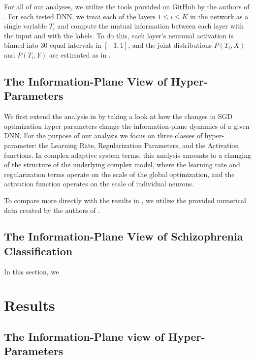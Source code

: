 \documentclass[conference, 5pt]{IEEEtran}
\begin{document}
For all of our analyses, we utilize the tools provided on GitHub by the authors of \cite{shwartz2017opening}.  For each tested DNN, we treat each of the layers $1\le i\le K$ in the network as a single variable $T_i$ and compute the mutual information between each layer with the input and with the labels. To do this, each layer's neuronal activation is binned into 30 equal intervals in $[-1, 1]$, and the joint distributions $P(T_i,X)$ and $P(T_i,Y)$ are estimated as in \cite{shwartz2017opening}.

\subsection{The Information-Plane View of Hyper-Parameters}

We first extend the analysis in \cite{shwartz2017opening} by taking a look at how the changes in SGD optimization hyper parameters change the information-plane dynamics of a given DNN. For the purpose of our analysis we focus on three classes of hyper-parameter: the Learning Rate, Regularization Parameters, and the Activation functions. In complex adaptive system terms, this analysis amounts to a changing of the structure of the underlying complex model, where the learning rate and regularization terms operate on the scale of the global optimization, and the activation function operates on the scale of individual neurons. 

To compare more directly with the results in \cite{shwartz2017opening}, we utilize the provided numerical data created by the authors of \cite{shwartz2017opening}.



\subsection{The Information-Plane View of Schizophrenia Classification}

In this section, we 

\section{Results}

\subsection{The Information-Plane view of Hyper-Parameters}
\end{document}
